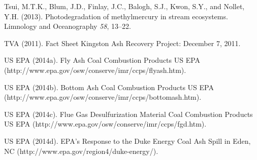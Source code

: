 \documentclass[ms]{uncgdissertationexp}
\theoremstyle{plain}
\theoremstyle{definition}
\theoremstyle{remark}
\begin{document}
  \hypertarget{ref-tsuiPhotodegradationMethylmercuryStream2013}{}
  Tsui, M.T.K., Blum, J.D., Finlay, J.C., Balogh, S.J., Kwon, S.Y., and
  Nollet, Y.H. (2013). Photodegradation of methylmercury in stream
  ecosystems. Limnology and Oceanography \emph{58}, 13--22.
  
  \hypertarget{ref-tvaFactSheetKingston2011}{}
  TVA (2011). Fact Sheet Kingston Ash Recovery Project: December 7, 2011.
  
  \hypertarget{ref-usepaFlyAshCoal2014}{}
  US EPA (2014a). Fly Ash \textbar{} Coal Combustion Products \textbar{}
  US EPA (http://www.epa.gov/osw/conserve/imr/ccps/flyash.htm).
  
  \hypertarget{ref-usepaBottomAshCoal2014}{}
  US EPA (2014b). Bottom Ash \textbar{} Coal Combustion Products
  \textbar{} US EPA
  (http://www.epa.gov/osw/conserve/imr/ccps/bottomash.htm).
  
  \hypertarget{ref-usepaFlueGasDesulfurization2014}{}
  US EPA (2014c). Flue Gas Desulfurization Material \textbar{} Coal
  Combustion Products \textbar{} US EPA
  (http://www.epa.gov/osw/conserve/imr/ccps/fgd.htm).
  
  \hypertarget{ref-usepaEPAResponseDuke2014}{}
  US EPA (2014d). EPA's Response to the Duke Energy Coal Ash Spill in
  Eden, NC (http://www.epa.gov/region4/duke-energy/).





\appendix


\end{document}
